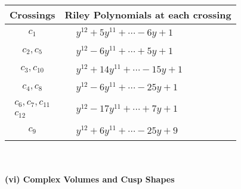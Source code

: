 \documentclass[1p]{elsarticle_modified}
\theoremstyle{definition}
\begin{document}
\begin{tabular}{m{50pt}|m{274pt}}
Crossings & \hspace{64pt}Riley Polynomials at each crossing \\
\hline $$\begin{aligned}c_{1}\end{aligned}$$&$\begin{aligned}
&y^{12}+5 y^{11}+\cdots-6 y+1
\end{aligned}$\\
\hline $$\begin{aligned}c_{2},c_{5}\end{aligned}$$&$\begin{aligned}
&y^{12}-6 y^{11}+\cdots+5 y+1
\end{aligned}$\\
\hline $$\begin{aligned}c_{3},c_{10}\end{aligned}$$&$\begin{aligned}
&y^{12}+14 y^{11}+\cdots-15 y+1
\end{aligned}$\\
\hline $$\begin{aligned}c_{4},c_{8}\end{aligned}$$&$\begin{aligned}
&y^{12}-6 y^{11}+\cdots-25 y+1
\end{aligned}$\\
\hline $$\begin{aligned}c_{6},c_{7},c_{11}\\c_{12}\end{aligned}$$&$\begin{aligned}
&y^{12}-17 y^{11}+\cdots+7 y+1
\end{aligned}$\\
\hline $$\begin{aligned}c_{9}\end{aligned}$$&$\begin{aligned}
&y^{12}+6 y^{11}+\cdots-25 y+9
\end{aligned}$\\
\hline
\end{tabular}\\~\\
\newpage\flushleft \textbf{(vi) Complex Volumes and Cusp Shapes}
\end{document}
